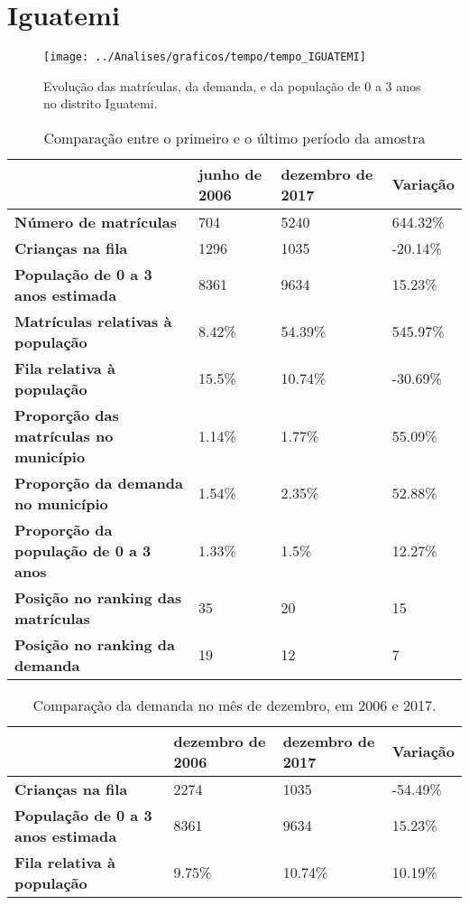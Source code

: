 \section{Iguatemi}
\begin{figure}[H]
\centering
\texttt{[image: ../Analises/graficos/tempo/tempo\_IGUATEMI]}
\caption{Evolução das matrículas, da demanda, e da população de 0 a 3 anos no distrito Iguatemi.}
\end{figure}
\begin{table}[H]
\begin{tabular}{|l|l|l|l|}
\hline
\textbf{}                                      & \textbf{junho de 2006}       & \textbf{dezembro de 2017}    & \textbf{Variação} \\ \hline
\textbf{Número de matrículas}                  & 704 & 5240 & 644.32\% \\ \hline
\textbf{Crianças na fila}                      & 1296 & 1035 & -20.14\% \\ \hline
\textbf{População de 0 a 3 anos estimada}      & 8361 & 9634 & 15.23\% \\ \hline
\textbf{Matrículas relativas à população}      & 8.42\% & 54.39\% & 545.97\% \\ \hline
\textbf{Fila relativa à população}             & 15.5\% & 10.74\% & -30.69\% \\ \hline
\textbf{Proporção das matrículas no município} & 1.14\% & 1.77\% & 55.09\% \\ \hline
\textbf{Proporção da demanda no município}     & 1.54\% & 2.35\% & 52.88\% \\ \hline
\textbf{Proporção da população de 0 a 3 anos}  & 1.33\% & 1.5\% & 12.27\% \\ \hline
\textbf{Posição no ranking das matrículas}     & 35 & 20 & 15 \\ \hline
\textbf{Posição no ranking da demanda}         & 19 & 12 & 7 \\ \hline
\end{tabular}
\caption{Comparação entre o primeiro e o último período da amostra}
\end{table}
\begin{table}[H]
\begin{tabular}{|l|l|l|l|}
\hline
\textbf{}                                 & \textbf{dezembro de 2006} & \textbf{dezembro de 2017} & \textbf{Variação} \\ \hline
\textbf{Crianças na fila}                      & 2274 & 1035 & -54.49\% \\ \hline
\textbf{População de 0 a 3 anos estimada}      & 8361 & 9634 & 15.23\% \\ \hline
\textbf{Fila relativa à população}             & 9.75\% & 10.74\% & 10.19\% \\ \hline
\end{tabular}
\caption{Comparação da demanda no mês de dezembro, em 2006 e 2017.}
\end{table}
